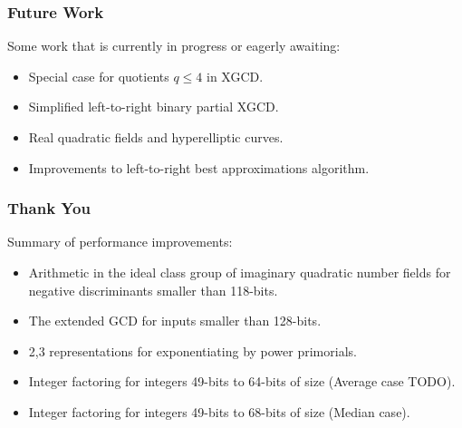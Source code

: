 \documentclass{beamer}
\begin{document}

\begin{frame}
\frametitle{Future Work}
Some work that is currently in progress or eagerly awaiting:
\begin{itemize}
\item Special case for quotients $q \le 4$ in XGCD.
\item Simplified left-to-right binary partial XGCD.
\item Real quadratic fields and hyperelliptic curves.
\item Improvements to left-to-right best approximations algorithm.
\end{itemize}
\end{frame}

\begin{frame}
\frametitle{Thank You}
Summary of performance improvements:
\begin{itemize}
\item Arithmetic in the ideal class group of imaginary quadratic number fields for negative discriminants smaller than 118-bits.
\item The extended GCD for inputs smaller than 128-bits.
\item 2,3 representations for exponentiating by power primorials.
\item Integer factoring for integers 49-bits to 64-bits of size (Average case TODO).
\item Integer factoring for integers 49-bits to 68-bits of size (Median case).
\end{itemize}
\end{frame}


\end{document}

